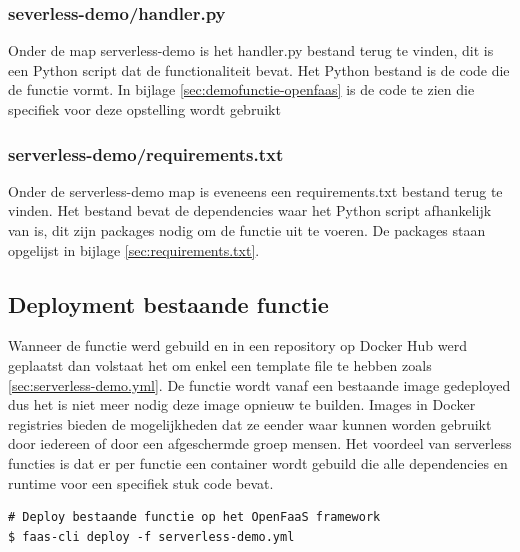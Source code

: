 \subsubsection{severless-demo/handler.py}
Onder de map serverless-demo is het handler.py bestand terug te vinden, dit is een Python script dat de functionaliteit bevat. Het Python bestand is de code die de functie vormt. In bijlage \ref{sec:demofunctie-openfaas} is de code te zien die specifiek voor deze opstelling wordt gebruikt

\subsubsection{serverless-demo/requirements.txt}
Onder de serverless-demo map is eveneens een requirements.txt bestand terug te vinden. Het bestand bevat de dependencies waar het Python script afhankelijk van is, dit zijn packages nodig om de functie uit te voeren. De packages staan opgelijst in bijlage \ref{sec:requirements.txt}.

\subsection{Deployment bestaande functie}
Wanneer de functie werd gebuild en in een repository op Docker Hub werd geplaatst dan volstaat het om enkel een template file te hebben zoals \ref{sec:serverless-demo.yml}. De functie wordt vanaf een bestaande image gedeployed dus het is niet meer nodig deze image opnieuw te builden. Images in Docker registries bieden de mogelijkheden dat ze eender waar kunnen worden gebruikt door iedereen of door een afgeschermde groep mensen. Het voordeel van serverless functies is dat er per functie een container wordt gebuild die alle dependencies en runtime voor een specifiek stuk code bevat.

\begin{lstlisting}
# Deploy bestaande functie op het OpenFaaS framework
$ faas-cli deploy -f serverless-demo.yml
\end{lstlisting}

